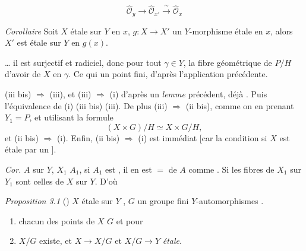 \documentclass[11pt,a4paper]{article}
\begin{document}


\[
\hat{\mathcal{O}}_y \to \hat{\mathcal{O}}_{x'} \xrightarrow{\ \sim\ } \hat{\mathcal{O}}_x
\]

\emph{Corollaire} Soit $X$ étale sur $Y$ en $x$, $g : X \to X'$ un
$Y$-morphisme étale en $x$, alors $X'$ est
étale sur $Y$ en $g(x)$.


\ldots{}  il est surjectif et radiciel, donc \ill{} pour tout
$\gamma \in Y$, la fibre géométrique de $P/H$ \struck{\ill{}} \ill{}
d'avoir  \ill{} de $X$ en $\gamma$. Ce qui
\ill{} un point fini, d'après l'application
précédente.

 (iii bis) $\Rightarrow$ (iii), et (iii) $\Rightarrow$ (i)
d'après un \emph{lemme} précédent, déjà .
Puis l'équivalence de (i) (iii bis) (iii).
De plus (iii) \struck{\ill{}} $\Rightarrow$ (ii bis), comme on \ill{}
en prenant $Y_1 = P$, et utilisant la formule
\[
(X \times G)/H \simeq X \times G/H,
\]
et (ii bis) $\Rightarrow$ (i). Enfin,
(ii bis) $\Rightarrow$ (i) est immédiat [car la condition
\struck{\ill{}} \ill{} si $X$ est étale par un \ill{}].

\emph{Cor.} \ill{} \ill{} $A$ sur $Y$, $X_1$ \ill{}
\ill{} $A_1$, si $A_1$ est , il en est
\ill{} $= $ de $A$ comme \ill{}. Si
les fibres de $X_1$ sur $Y_1$ sont
 \ill{}
\ill{} celles de $X$ sur $Y$. D'où \ill{}


\emph{Proposition 3.1} (\ill{}) $X$ étale sur $Y$ \struck{\ill{}}
, $G$ un
groupe fini   $Y$-automorphismes \struck{\ill{}}.
\begin{enumerate}
\item[(i)]  chacun des points de $X$ \ill{} $G$ \ill{}
\struck{\ill{}} \ill{} \ill{} et pour \ill{}
\item[(ii)] \struck{\ill{}} $X/G$ existe, et $X \to X/G$ \ill{}
et $X/G \to Y$ \ill{} \emph{étale}.
\end{enumerate}
\end{document}
